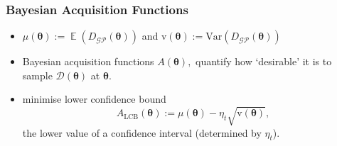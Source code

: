 \documentclass{beamer}
\DeclareMathOperator{\E}{\mathbb{E}}
\begin{document}
\begin{frame}
    \frametitle{Bayesian Acquisition Functions}
    \begin{itemize}
        \item $\mu(\bm{\theta}) := \E(D_\mathcal{GP}(\bm{\theta}))$ and
              $\mathrm{v}(\bm{\theta})
                  := \mathrm{Var}(D_\mathcal{GP}(\bm{\theta}))$
        \item Bayesian acquisition functions $A(\bm{\theta}),$ quantify how
              `desirable' it is to sample $\mathcal{D}(\bm{\theta})$ at
              $\bm{\theta}.$
        \item <2-> \cite{gutmann_bayesian_2016} minimise lower confidence bound
              $$
                  A_\text{LCB}(\bm\theta)
                  := \mu(\bm\theta) - \eta_t\sqrt{\mathrm{v}(\bm\theta)},
              $$
              the lower value of a confidence interval (determined by $\eta_t$).
    \end{itemize}
\end{frame}
\end{document}
